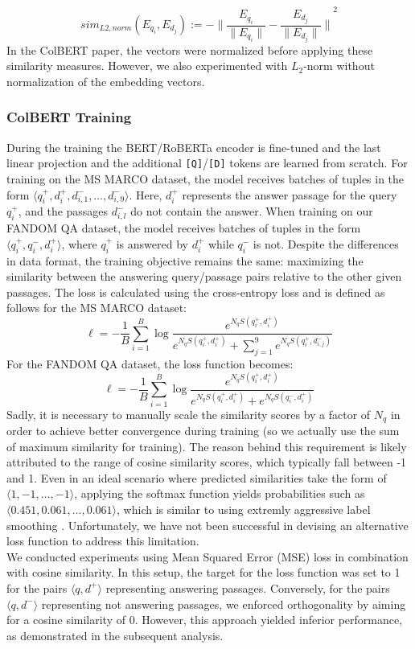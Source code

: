 \documentclass[11pt]{article}
\begin{document}
$$
sim_{L2,norm}(E_{q_i}, E_{d_j}) := -{\| \frac{E_{q_i}}{\| E_{q_i} \|}  - \frac{E_{d_j}}{\| E_{d_j} \|} \|}^2
$$
In the ColBERT paper, the vectors were normalized before applying these similarity measures. However, we also experimented with $L_2$-norm without normalization of the embedding vectors.

\subsubsection{ColBERT Training}
During the training the BERT/RoBERTa encoder is fine-tuned and the last linear projection and the additional \texttt{[Q]}/\texttt{[D]} tokens are learned from scratch. For training on the MS MARCO dataset, the model receives batches of tuples in the form $\langle q_i^+, d_i^+, d_{i, 1}^-, \dots, d_{i, 9}^-\rangle$. Here, $d_i^+$ represents the answer passage for the query $q_i^+$, and the passages $d_{i, l}^-$ do not contain the answer. When training on our FANDOM QA dataset, the model receives batches of tuples in the form $\langle q_i^+, q_i^-, d_i^+\rangle$, where $q_i^+$ is answered by $d_i^+$ while $q_i^-$ is not. Despite the differences in data format, the training objective remains the same: maximizing the similarity between the answering query/passage pairs relative to the other given passages. The loss is calculated using the cross-entropy loss and is defined as follows for the MS MARCO dataset:
$$
\ell = -\frac{1}{B} \sum_{i=1}^{B} \log \frac{e^{N_q S(q_i^+, d_i^+)}}{e^{N_q S(q_i^+, d_i^+)} + \sum_{j=1}^{9}{e^{N_q S(q_i^+, d_{i, j}^-)}}}
$$
For the FANDOM QA dataset, the loss function becomes:
$$
\ell = -\frac{1}{B} \sum_{i=1}^{B} \log \frac{e^{N_q S(q_i^+, d_i^+)}}{e^{N_q S(q_i^+, d_i^+)} + e^{N_q S(q_i^-, d_i^+)}}
$$
Sadly, it is necessary to manually scale the similarity scores by a factor of $N_q$ in order to achieve better convergence during training (so we actually use the sum of maximum similarity for training). The reason behind this requirement is likely attributed to the range of cosine similarity scores, which typically fall between -1 and 1. Even in an ideal scenario where predicted similarities take the form of $\langle 1, -1, \dots, -1\rangle$, applying the softmax function yields probabilities such as $\langle 0.451, 0.061, \dots, 0.061\rangle$, which is similar to using extremly aggressive label smoothing \cite{szegedy2015rethinking}. Unfortunately, we have not been successful in devising an alternative loss function to address this limitation. \\
We conducted experiments using Mean Squared Error (MSE) loss in combination with cosine similarity. In this setup, the target for the loss function was set to 1 for the pairs $\langle q, d^+\rangle$ representing answering passages. Conversely, for the pairs $\langle q, d^-\rangle$ representing not answering passages, we enforced orthogonality by aiming for a cosine similarity of 0. However, this approach yielded inferior performance, as demonstrated in the subsequent analysis.
\end{document}
